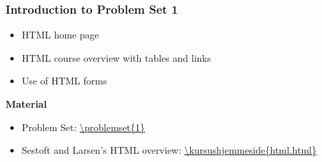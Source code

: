 \documentclass[dvipsnames]{beamer}
\begin{document}







\begin{frame}[fragile]
\frametitle{Introduction to Problem Set 1}

\begin{itemize}
\item HTML home page
\item HTML course overview with tables and links
\item Use of HTML forms
\end{itemize}

\textbf{Material}
\begin{itemize}
\item Problem Set: \url{\problemset{1}}
\item Sestoft and Larsen's HTML overview:
   \url{\kursushjemmeside{html.html}}
  \end{itemize}
\end{frame}
\end{document}
